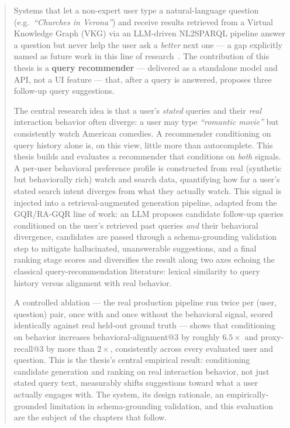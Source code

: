 \documentclass[a4paper,11pt]{report}
\newenvironment{poliabstract}[1]
  {\renewcommand{\abstractname}{#1}\begin{abstract}}
  {\end{abstract}}
\begin{document}
\newpage\null\thispagestyle{empty}\newpage

\begin{poliabstract}{Abstract}

Systems that let a non-expert user type a natural-language question (e.g.\ \emph{``Churches in
Verona''}) and receive results retrieved from a Virtual Knowledge Graph (VKG) via an LLM-driven
NL2SPARQL pipeline answer a question but never help the user ask a \emph{better} next one --- a gap
explicitly named as future work in this line of research~\cite{balasooriya2026}. The contribution
of this thesis is a \textbf{query recommender} --- delivered as a standalone model and API, not a
UI feature --- that, after a query is answered, proposes three follow-up query suggestions.

The central research idea is that a user's \emph{stated} queries and their \emph{real} interaction
behavior often diverge: a user may type \emph{``romantic movie''} but consistently watch American
comedies. A recommender conditioning on query history alone is, on this view, little more than
autocomplete. This thesis builds and evaluates a recommender that conditions on \emph{both}
signals. A per-user behavioral preference
profile is constructed from real (synthetic but behaviorally rich) watch and search data,
quantifying how far a user's stated search intent diverges from what they actually watch. This
signal is injected into a retrieval-augmented generation pipeline, adapted from the GQR/RA-GQR
line of work: an LLM proposes candidate follow-up queries conditioned on the user's retrieved past
queries \emph{and} their behavioral divergence, candidates are passed through a schema-grounding
validation step to mitigate hallucinated, unanswerable suggestions, and a final ranking stage
scores and diversifies the result along two axes echoing the classical query-recommendation
literature: lexical similarity to query history versus alignment with real behavior.

A controlled ablation --- the real production pipeline run twice per (user, question) pair, once
with and once without the behavioral signal, scored identically against real held-out ground truth
--- shows that conditioning on behavior increases behavioral-alignment@3 by roughly $6.5\times$ and
proxy-recall@3 by more than $2\times$, consistently across every evaluated user and question. This
is the thesis's central empirical result: conditioning candidate generation and ranking on real
interaction behavior, not just stated query text, measurably shifts suggestions toward what a user
actually engages with. The system, its design rationale, an empirically-grounded limitation in
schema-grounding validation, and this evaluation are the subject of the chapters that follow.

\end{poliabstract}
\end{document}
